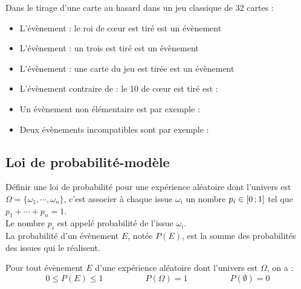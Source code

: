 \begin{Exemple}
Dans le tirage d'une carte au hasard dans un jeu classique de 32 cartes :
\begin{itemize}[label=\textcolor{Couleur8}{$\bullet$}]
\item L'évènement : \og le roi de c{\oe}ur est tiré \fg{} est un évènement \ligne

\item L'évènement : \og un trois est tiré \fg{} est un évènement \ligne

\item L'évènement : \og une carte du jeu est tirée \fg{} est un évènement \ligne

\item L'évènement contraire de : \og le 10 de c{\oe}ur est tiré \fg{} est : \ligne

\item Un évènement non élémentaire est par exemple : \ligne

\item Deux évènements incompatibles sont par exemple : \ligne

\end{itemize}


\end{Exemple}

\newpage

\subsection{Loi de probabilité-modèle}
\vspace{0.3cm}
\begin{Définition}
Définir une loi de probabilité pour une expérience aléatoire dont l'univers est $\Omega=\{\omega_1,\cdots,\omega_n\}$, c'est associer à chaque issue $\omega_i$ un nombre $p_i\in \mathopen{[}0\,;1\mathclose{]}$ tel que $p_1+\cdots+ p_n=1$.\\
Le nombre $p_i$ est appelé probabilité de l'issue $\omega_i$.\\
La probabilité d'un évènement $E$, notée $P(E)$, est la somme des probabilités des issues qui le réalisent.

\end{Définition}
\vspace{0.3cm}
\begin{Propriété}
Pour tout évènement $E$ d'une expérience aléatoire dont l'univers est $\Omega$, on a :
$$0\leq P(E)\leq 1 \quad\quad\quad\quad\quad P(\Omega)=1 \quad\quad\quad\quad\quad P(\emptyset)=0$$
\end{Propriété}
\vspace{0.3cm}

